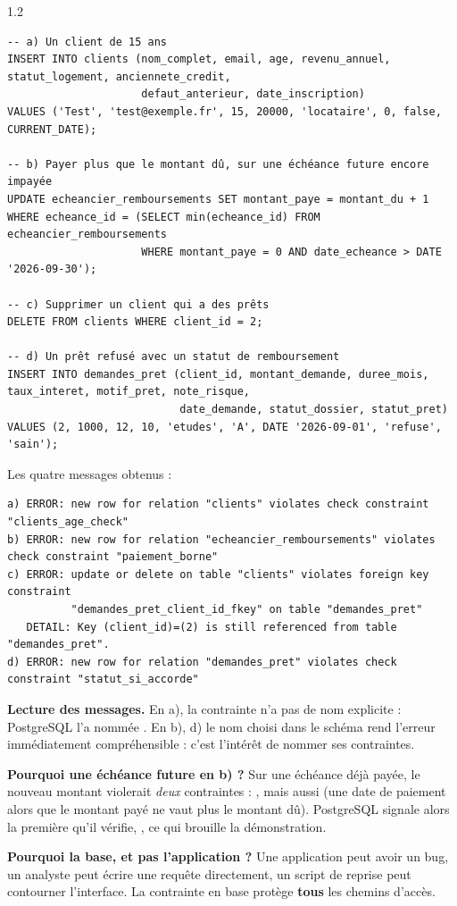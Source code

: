 \begin{correction}{1.2}
\begin{lstlisting}[style=long]
-- a) Un client de 15 ans
INSERT INTO clients (nom_complet, email, age, revenu_annuel, statut_logement, anciennete_credit,
                     defaut_anterieur, date_inscription)
VALUES ('Test', 'test@exemple.fr', 15, 20000, 'locataire', 0, false, CURRENT_DATE);

-- b) Payer plus que le montant dû, sur une échéance future encore impayée
UPDATE echeancier_remboursements SET montant_paye = montant_du + 1
WHERE echeance_id = (SELECT min(echeance_id) FROM echeancier_remboursements
                     WHERE montant_paye = 0 AND date_echeance > DATE '2026-09-30');

-- c) Supprimer un client qui a des prêts
DELETE FROM clients WHERE client_id = 2;

-- d) Un prêt refusé avec un statut de remboursement
INSERT INTO demandes_pret (client_id, montant_demande, duree_mois, taux_interet, motif_pret, note_risque,
                           date_demande, statut_dossier, statut_pret)
VALUES (2, 1000, 12, 10, 'etudes', 'A', DATE '2026-09-01', 'refuse', 'sain');
\end{lstlisting}

Les quatre messages obtenus :
\begin{lstlisting}[style=sortie]
a) ERROR: new row for relation "clients" violates check constraint "clients_age_check"
b) ERROR: new row for relation "echeancier_remboursements" violates check constraint "paiement_borne"
c) ERROR: update or delete on table "clients" violates foreign key constraint
          "demandes_pret_client_id_fkey" on table "demandes_pret"
   DETAIL: Key (client_id)=(2) is still referenced from table "demandes_pret".
d) ERROR: new row for relation "demandes_pret" violates check constraint "statut_si_accorde"
\end{lstlisting}

\textbf{Lecture des messages.} En a), la contrainte n'a pas de nom explicite : PostgreSQL l'a nommée
. En b), d) le nom choisi dans le schéma rend l'erreur immédiatement
compréhensible : c'est l'intérêt de nommer ses contraintes.

\textbf{Pourquoi une échéance future en b) ?} Sur une échéance déjà payée, le nouveau montant violerait
\emph{deux} contraintes : , mais aussi  (une date de paiement
alors que le montant payé ne vaut plus le montant dû). PostgreSQL signale alors la première qu'il
vérifie, , ce qui brouille la démonstration.

\textbf{Pourquoi la base, et pas l'application ?} Une application peut avoir un bug, un analyste peut
écrire une requête directement, un script de reprise peut contourner l'interface. La contrainte en
base protège \textbf{tous} les chemins d'accès.
\end{correction}

